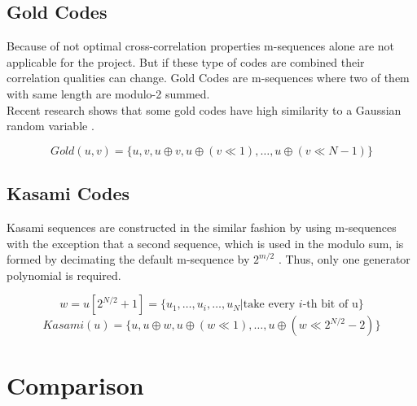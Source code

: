 
\subsection{Gold Codes}

Because of not optimal cross-correlation properties m-sequences alone are not applicable for the project. But if these type of codes are combined their correlation qualities can change. Gold Codes are m-sequences where two of them with same length are modulo-2 summed. \cite{proakis08} \\
Recent research shows that some gold codes have high similarity to a Gaussian random variable \cite{merrifield}. 

\begin{equation}
Gold(u,v)=\{u,v,u\oplus v,u\oplus(v \ll1),\dots,u\oplus(v\ll N-1)\}
\end{equation}


\subsection{Kasami Codes}

Kasami sequences are constructed in the similar fashion by using m-sequences with the exception that a second sequence, which is used in the modulo sum, is formed by decimating the default m-sequence by  $2^{m/2}$ \cite{proakis08} \cite{sarwate80} \cite{peterson72}. Thus, only one generator polynomial is required.

\begin{equation}
w=u[2^{N/2}+1]=\{u_1,\dots, u_i, \dots,u_{N}|\text{take every }i\text{-th bit of u}\} 
\end{equation}
\begin{equation}
Kasami(u)=\{u,u\oplus w,u\oplus(w \ll1),\dots,u\oplus(w\ll2^{N/2}-2)\}
\end{equation}


\section{Comparison}


